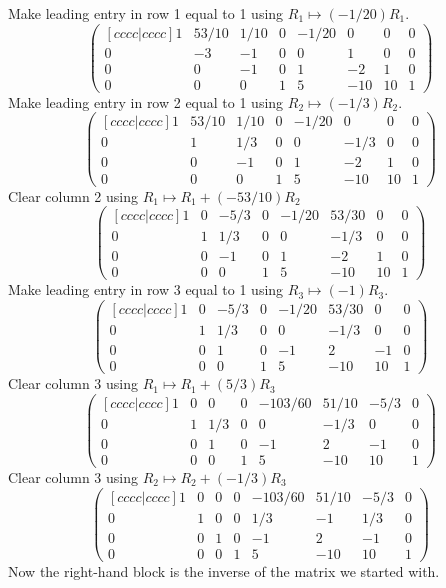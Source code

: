 \documentclass{article}
\begin{document}
Make leading entry in row 1 equal to 1 using \(R_1\mapsto
(-1/20)R_1\). \[\begin{pmatrix}[ c c c c | c c c c ] 1 & 53/10 & 1/10
& 0 & -1/20 & 0 & 0 & 0 \\ 0 & -3 & -1 & 0 & 0 & 1 & 0 & 0 \\ 0 & 0 &
-1 & 0 & 1 & -2 & 1 & 0 \\ 0 & 0 & 0 & 1 & 5 & -10 & 10 & 1
\end{pmatrix}\]Make leading entry in row 2 equal to 1 using
\(R_2\mapsto (-1/3)R_2\). \[\begin{pmatrix}[ c c c c | c c c c ] 1 &
53/10 & 1/10 & 0 & -1/20 & 0 & 0 & 0 \\ 0 & 1 & 1/3 & 0 & 0 & -1/3 & 0
& 0 \\ 0 & 0 & -1 & 0 & 1 & -2 & 1 & 0 \\ 0 & 0 & 0 & 1 & 5 & -10 & 10
& 1 \end{pmatrix}\]Clear column 2 using \(R_1\mapsto
R_1+(-53/10)R_2\)\[\begin{pmatrix}[ c c c c | c c c c ] 1 & 0 & -5/3 &
0 & -1/20 & 53/30 & 0 & 0 \\ 0 & 1 & 1/3 & 0 & 0 & -1/3 & 0 & 0 \\ 0 &
0 & -1 & 0 & 1 & -2 & 1 & 0 \\ 0 & 0 & 0 & 1 & 5 & -10 & 10 & 1
\end{pmatrix}\]Make leading entry in row 3 equal to 1 using
\(R_3\mapsto (-1)R_3\). \[\begin{pmatrix}[ c c c c | c c c c ] 1 & 0
& -5/3 & 0 & -1/20 & 53/30 & 0 & 0 \\ 0 & 1 & 1/3 & 0 & 0 & -1/3 & 0 &
0 \\ 0 & 0 & 1 & 0 & -1 & 2 & -1 & 0 \\ 0 & 0 & 0 & 1 & 5 & -10 & 10 &
1 \end{pmatrix}\]Clear column 3 using \(R_1\mapsto
R_1+(5/3)R_3\)\[\begin{pmatrix}[ c c c c | c c c c ] 1 & 0 & 0 & 0 &
-103/60 & 51/10 & -5/3 & 0 \\ 0 & 1 & 1/3 & 0 & 0 & -1/3 & 0 & 0 \\ 0
& 0 & 1 & 0 & -1 & 2 & -1 & 0 \\ 0 & 0 & 0 & 1 & 5 & -10 & 10 & 1
\end{pmatrix}\]Clear column 3 using \(R_2\mapsto
R_2+(-1/3)R_3\)\[\begin{pmatrix}[ c c c c | c c c c ] 1 & 0 & 0 & 0 &
-103/60 & 51/10 & -5/3 & 0 \\ 0 & 1 & 0 & 0 & 1/3 & -1 & 1/3 & 0 \\ 0
& 0 & 1 & 0 & -1 & 2 & -1 & 0 \\ 0 & 0 & 0 & 1 & 5 & -10 & 10 & 1
\end{pmatrix}\]Now the right-hand block is the inverse of the matrix
we started with.
\end{document}
